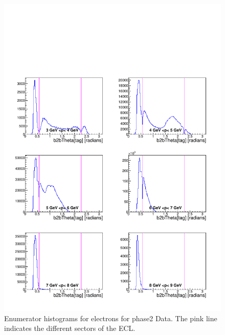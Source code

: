 \documentclass[a4paper,11pt,twosided,final,german,openbib,pdftex,listof=totoc,bibliography=totoc]{scrbook}
\begin{document}
\begin{appendix}
\begin{figure}[!htbp]
	\centering
	\includegraphics[width=\textwidth]{Plots/master/xPMThetaemE_Data}
	\caption[Momentum $\theta$ Electron Enumerator Histogram Phase2 Data]{Enumerator histograms for electrons for phase2 Data. The pink line indicates the different sectors of the ECL.}
	\label{plt:PMThetaemE_Data}
\end{figure}



\end{appendix}
\end{document}

